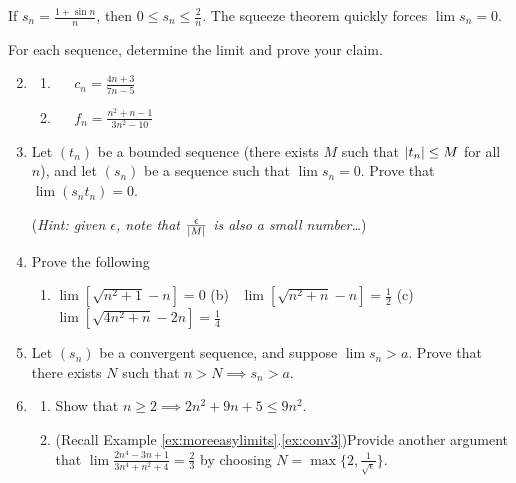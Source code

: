 \begin{example}{}{}
	If $s_n=\frac{1+\sin n}n$, then $0\le s_n\le \frac 2n$. The squeeze theorem quickly forces $\lim s_n=0$.
\end{example}

\vfil

\begin{exercisessec}{}{}
	\exstart For each sequence, determine the limit and prove your claim.
	\begin{enumerate}\setcounter{enumi}{1}
  \item[]\begin{enumerate}
    \item{} \  \ $c_n=\frac{4n+3}{7n-5}$
    \setcounter{enumii}{3}
    \item{} \  \ $f_n=\frac{n^2+n-1}{3n^2-10}$
  \end{enumerate}


  \item\label{exs:tbddproduct}%
  Let $(t_n)$ be a bounded sequence (there exists $M$ such that $\left| t_n\right|\le M$ for all $n$), and let $(s_n)$ be a sequence such that $\lim s_n=0$. Prove that $\lim(s_nt_n)=0$.\par
  (\emph{Hint: given $\epsilon$, note that $\frac\epsilon{\left| M\right|}$ is also a small number\ldots})
 
 
  \item%
  Prove the following
  \begin{enumerate}
	  \item $\lim[\sqrt{n^2+1}-n]=0$ \hspace{30pt} (b) \ $\lim[\sqrt{n^2+n}-n]=\frac 12$\hspace{30pt} (c) \ $\lim[\sqrt{4n^2+n}-2n]=\frac 14$
  \end{enumerate}
  

  \item\label{exs:convlowerbound}%
  Let $(s_n)$ be a convergent sequence, and suppose $\lim s_n>a$. Prove that there exists $N$ such that $n>N\implies s_n>a$.
  
    
  \item\label{exs:conv23again}
  \begin{enumerate}
    \item Show that $n\ge 2\implies 2n^2+9n+5\le 9n^2$.
    \item (Recall Example \ref*{ex:moreeasylimits}.\ref{ex:conv3})\quad Provide another argument that $\lim \frac{2n^4-3n+1}{3n^4+n^2+4}=\frac 23$ by choosing $N=\max\{2,\frac 1{\sqrt\epsilon}\}$.
 	\end{enumerate}
 	

\end{enumerate}
\end{exercisessec}
